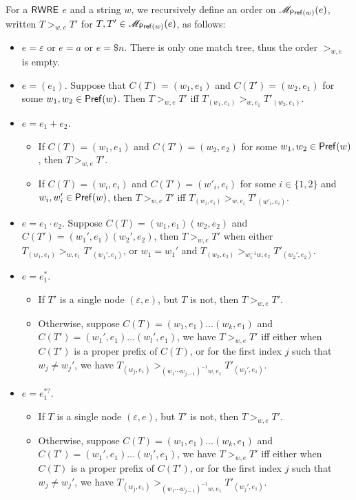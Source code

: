   \begin{definition}\label{def-regex-semantics}
  		
  	For a ${\sf RWRE}$ $e$ and a string $w$, we recursively define an order on $\mathscr{M}_{\mathsf{Pref}(w)}(e)$, written $T
  	>_{w,e} T'$ for $T, T' \in \mathscr{M}_{\mathsf{Pref}(w)}(e)$, as follows:
  	\begin{itemize}
  		\item $e = \varepsilon$ or $e = a$ or $e = \$ n$. There is only one match tree, thus the
  		order $>_{w, e}$ is empty.
  		
  		\item $e = (e_1)$. Suppose that $C (T) = (w_1, e_1)$ and $C (T') = (w_2, e_1)$ for some $w_1, w_2 \in \mathsf{Pref}(w)$.
  		Then $T >_{w,e} T'$ iff $T_{(w_1, e_1)} >_{w, e_1} T'_{(w_2, e_1)}$.
  		
  		\item $e = e_1 + e_2$.
  		\begin{itemize}
  			\item If $C (T) = (w_1, e_1)$ and $C (T') = (w_2, e_2)$ for some $w_1, w_2 \in \mathsf{Pref}(w)$, then $T >_{w,e} T'$.
%  			
  			\item If $C (T) = (w_i, e_i)$ and $C (T') = (w'_i, e_i)$ for some $i \in \{ 1,
  			2 \}$ and $w_i, w'_i \in \mathsf{Pref}(w)$, then $T >_{w,e} T'$ iff $T_{(w_i, e_i)} >_{w, e_i} T'_{(w'_i, e_i)}$.
  		\end{itemize}
  		\item $e = e_1 \cdot e_2$. Suppose $C (T) = (w_1, e_1) (w_2, e_2)$ and $C (T') =
  		(w_1', e_1) (w_2', e_2)$, then $T >_{w,e} T'$ when either $T_{(w_1, e_1)} >_{w, e_1}
  		T'_{(w_1', e_1)}$, or $w_1 = w_1'$ and $T_{(w_2, e_2)} >_{w_1^{-1}w, e_2} T'_{(w_2', e_2)}$.
%  		
  		\item $e = e_1^{\ast}$. 
		\begin{itemize}
		\item If $T' $ is  a single node $(\varepsilon, e)$, but $T$ is not, then $T >_{w, e} T'$.
  		\item Otherwise, suppose $C(T) = (w_1, e_1) \ldots (w_k, e_1)$ and $C (T') =
  		(w_1', e_1) \ldots (w_l', e_1)$, we have $T >_{w,e} T'$ iff either when $C (T')$
  		is a proper prefix of $C (T)$, or for the first index $j$ such that $w_j
  		\neq w_j'$, we have $T_{(w_j, e_1)} >_{(w_1\cdots w_{j-1})^{-1}w, e_1} T'_{(w_j', e_1)}$.
		\end{itemize}
%
  		\item $e = e_1^{\ast?}$. 
		\begin{itemize}
		\item If $T$ is  a single node  $(\varepsilon, e)$, but $T'$ is not, then $T >_{w, e} T'$.
  		\item Otherwise, suppose $C(T) = (w_1, e_1) \ldots (w_k, e_1)$ and $C (T') =
  		(w_1', e_1) \ldots (w_l', e_1)$, we have $T >_{w,e} T'$ iff either when $C (T)$
  		is a proper prefix of $C (T')$, or for the first index $j$ such that $w_j
  		\neq w_j'$, we have $T_{(w_j, e_1)} >_{(w_1\cdots w_{j-1})^{-1}w, e_1} T'_{(w_j', e_1)}$.
		\end{itemize}
  	\end{itemize}
  	

\end{definition}
